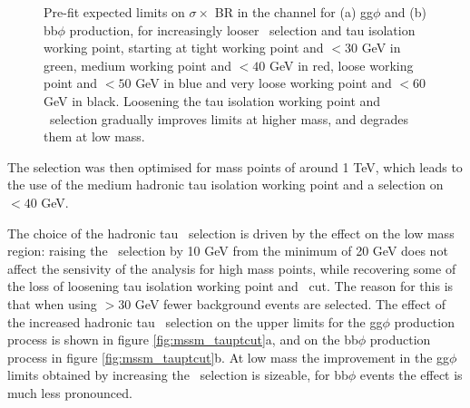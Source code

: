 \begin{figure}[h!]
\begin{center}
\end{center}
\caption{Pre-fit expected limits on $\sigma \times$ BR in the \mutau channel for (a) gg$\phi$ and
(b) bb$\phi$ production, for increasingly looser \mT~selection and tau isolation working point, starting
at tight working point and \mT$<30$ GeV in green, medium working point and \mT$<40$ GeV in red,
loose working point and \mT$<50$ GeV in blue and very loose working point and \mT$<60$ GeV in black. Loosening
the tau isolation working point and \mT~selection gradually improves limits at higher mass, and
degrades them at low mass.}
\label{fig:mssm_gradcuts_mt}
\end{figure}
The selection was then optimised for mass points of around 1 TeV, which leads to 
the use of the medium hadronic tau isolation working point and a selection on \mT$<40$ GeV.

The choice of the hadronic tau \pT~selection is driven by the effect on the low mass region:
raising the \pT~selection by 10 GeV from the minimum of 20 GeV does not affect the sensivity
of the analysis for high mass points, while recovering some of the loss of loosening 
tau isolation working point and \mT~cut. The reason for this is that when using \pT$>30$ GeV 
fewer background events are selected. The effect of the increased hadronic tau \pT~selection on the 
upper limits for the gg$\phi$ production process is shown
in figure \ref{fig:mssm_tauptcut}a, and on the bb$\phi$ production process
in figure \ref{fig:mssm_tauptcut}b. At low mass the improvement in the gg$\phi$ limits
obtained by increasing the \pT~selection is sizeable, for bb$\phi$ events the effect is much
less pronounced.

